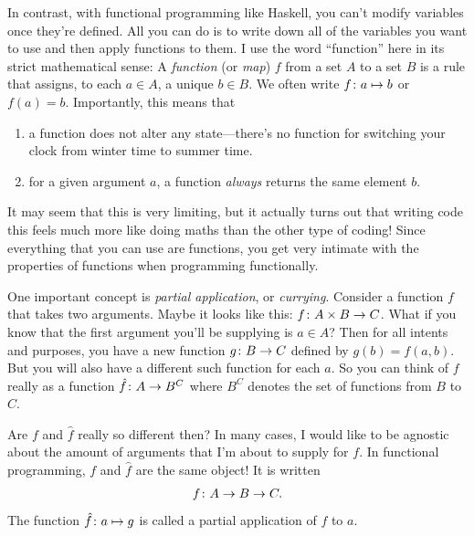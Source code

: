 \documentclass[english, 12pt]{article}
\begin{document}
In contrast, with functional programming like Haskell, you can't modify variables once they're defined.
All you can do is to write down all of the variables you want to use and then apply functions to them.
I use the word \enquote{function} here in its strict mathematical sense: A \emph{function} (or \emph{map}) \(f\) from a set \(A\) to a set \(B\) is a rule that assigns, to each \(a \in A\), a unique \(b \in B\).
We often write \(f \colon a \mapsto b\) or \(f(a) = b\).
Importantly, this means that
\begin{enumerate}
	\item a function does not alter any state---there's no function for switching your clock from winter time to summer time.
	\item for a given argument \(a\), a function \emph{always} returns the same element \(b\).
\end{enumerate}

It may seem that this is very limiting, but it actually turns out that writing code this feels much more like doing maths than the other type of coding!
Since everything that you can use are functions, you get very intimate with the properties of functions when programming functionally.

One important concept is \emph{partial application}, or \emph{currying}.
Consider a function \(f\) that takes two arguments.
Maybe it looks like this: \(f \colon A \times B \to C\).
What if you know that the first argument you'll be supplying is \(a \in A\)?
Then for all intents and purposes, you have a new function \(g \colon B \to C\) defined by \(g(b) = f(a, b)\).
But you will also have a different such function for each \(a\).
So you can think of \(f\) really as a function \(\hat f\colon A \to B^C\) where \(B^C\) denotes the set of functions from \(B\) to \(C\).

Are \(f\) and \(\hat f\) really so different then?
In many cases, I would like to be agnostic about the amount of arguments that I'm about to supply for \(f\).
In functional programming, \(f\) and \(\hat f\) are the same object!
It is written
\begin{align*}
	f \colon A \to B \to C.
\end{align*}
The function \(\hat f \colon a \mapsto g\) is called a partial application of \(f\) to \(a\).
\end{document}
